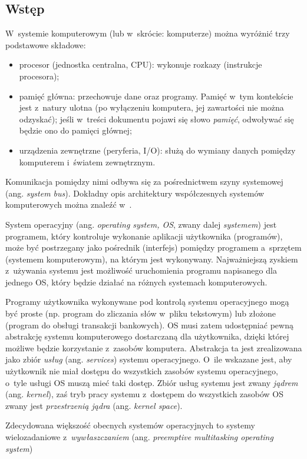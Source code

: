 \documentclass[12pt]{mwart}
\begin{document}
\subsection{Wstęp}
\indent 
	W~systemie komputerowym (lub w~skrócie: komputerze) można wyróżnić trzy podstawowe składowe:
	\begin{itemize}
		\item procesor (jednostka centralna, CPU): wykonuje rozkazy (instrukcje procesora);
		\item pamięć główna: przechowuje dane oraz programy. Pamięć w~tym kontekście jest z~natury ulotna (po wyłączeniu komputera,
			jej zawartości nie można odzyskać); jeśli w~treści dokumentu pojawi się słowo \emph{pamięć}, odwoływać się będzie ono do
			pamięci głównej;
		\item urządzenia zewnętrzne (peryferia, I/O): służą do wymiany danych pomiędzy komputerem i~światem zewnętrznym.
	\end{itemize}
	Komunikacja pomiędzy nimi odbywa się za pośrednictwem szyny systemowej (ang. \emph{system bus}).
	Dokładny opis architektury współczesnych
	systemów komputerowych można znaleźć w~\cite{hennessy}.
\par
\indent
	System operacyjny (ang. \emph{operating system, OS}, zwany dalej \emph{systemem}) jest programem, 
	który kontroluje wykonanie aplikacji użytkownika (programów),
	może być postrzegany jako pośrednik (interfejs) pomiędzy programem a~sprzętem (systemem komputerowym), na którym jest wykonywany.
	Najważniejszą zyskiem z~używania systemu jest możliwość uruchomienia programu napisanego dla jednego OS, który będzie działać na różnych systemach komputerowych.
\par
%
\indent
	Programy użytkownika wykonywane pod kontrolą systemu operacyjnego mogą być proste (np. program do zliczania słów w~pliku tekstowym)
	lub złożone (program do obsługi transakcji bankowych). OS musi zatem udostępniać pewną abstrakcję systemu komputerowego dostarczaną dla użytkownika,
  dzięki której możliwe będzie korzystanie z~zasobów komputera. Abstrakcja ta jest zrealizowana jako zbiór \emph{usług} (ang. \emph{services}) systemu operacyjnego.
  O~ile wskazane jest, aby użytkownik nie miał dostępu do wszystkich zasobów systemu operacyjnego, o~tyle usługi OS muszą mieć taki dostęp.
  Zbiór usług systemu jest zwany \emph{jądrem} (ang. \emph{kernel}), zaś tryb pracy systemu z~dostępem do wszystkich zasobów OS zwany jest
  \emph{przestrzenią jądra} (ang. \emph{kernel space}).
\par
%
\indent
  Zdecydowana większość obecnych systemów operacyjnych to systemy wielozadaniowe z~\emph{wywłaszczaniem} (ang. \emph{pre\dywiz emptive multitasking operating system})
\end{document}
